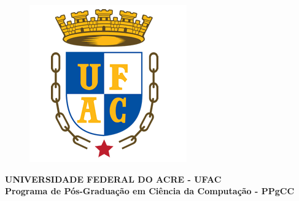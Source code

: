 \documentclass[
	12pt,				%
	openright,			%
	oneside,			%
	a4paper,			%
	english,			%
	french,				%
	spanish,			%
	brazil				%
	]{abntex2}
\begin{document}

\frenchspacing 


\begin{figure}
	\centering
	\includegraphics[width=.2\textwidth]{imagens/brasao_UFAC.png}	
	\label{fig:UFAC}
\end{figure}
\begin{center}
	\textbf{UNIVERSIDADE FEDERAL DO ACRE - UFAC \\
	Programa de Pós-Graduação em Ciência da Computação - PPgCC}
\end{center}
\vspace{3cm}
\imprimircapa

\imprimirfolhaderosto*

%
%     
\end{document}
